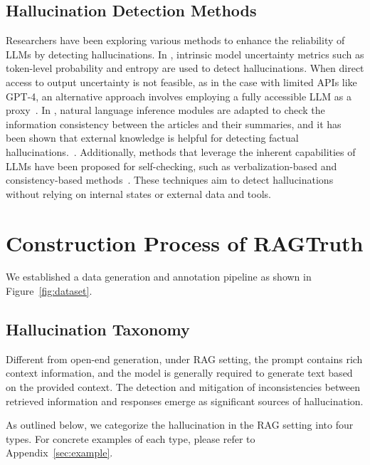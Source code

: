\documentclass[11pt]{article}
\begin{document}
\subsection{Hallucination Detection Methods}
Researchers have been exploring various methods to enhance the reliability of LLMs by detecting hallucinations. 
In \citet{Azaria2023,xiao2021hallucination,malinin2021uncertainty}, intrinsic model uncertainty metrics such as token-level probability and entropy are used to detect hallucinations. 
When direct access to output uncertainty is not feasible, as in the case with limited APIs like GPT-4, an alternative approach involves employing a fully accessible LLM as a proxy~\cite{Manakul2023-selfcheckgpt}.
In \citet{falke2019ranking, barrantes2020nli}, natural language inference modules are adapted to check the information consistency between the articles and their summaries, and it has been shown that external knowledge is helpful for detecting factual hallucinations.~\cite{guo2022survey, Mallen2022}. 
Additionally, methods that leverage the inherent capabilities of LLMs have been proposed for self-checking, such as verbalization-based and consistency-based methods~\cite{xiong2023llms, Manakul2023-selfcheckgpt}. 
These techniques aim to detect hallucinations without relying on internal states or external data and tools.

\section{Construction Process of RAGTruth}
We established a data generation and annotation pipeline as shown in Figure~\ref{fig:dataset}. 

\subsection{Hallucination Taxonomy}
Different from open-end generation, under RAG setting, the prompt contains rich context information, and the model is generally required to generate text based on the provided context. The detection and mitigation of inconsistencies between retrieved information and responses emerge as significant sources of hallucination.

As outlined below, we categorize the hallucination in the RAG setting into four types. For concrete examples of each type, please refer to Appendix~\ref{sec:example}.
\end{document}
